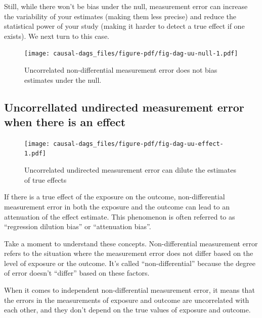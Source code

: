 \documentclass[
  singlecolumn]{report}
\begin{document}
Still, while there won't be bias under the null, measurement error can
increase the variability of your estimates (making them less precise)
and reduce the statistical power of your study (making it harder to
detect a true effect if one exists). We next turn to this case.

\begin{figure}

{\centering \texttt{[image: causal-dags\_files/figure-pdf/fig-dag-uu-null-1.pdf]}

}

\caption{\label{fig-dag-uu-null}Uncorrelated non-differential
measurement error does not bias estimates under the null.}

\end{figure}

\hypertarget{uncorrellated-undirected-measurement-error-when-there-is-an-effect}{%
\subsection{Uncorrellated undirected measurement error when there is an
effect}\label{uncorrellated-undirected-measurement-error-when-there-is-an-effect}}

\begin{figure}

{\centering \texttt{[image: causal-dags\_files/figure-pdf/fig-dag-uu-effect-1.pdf]}

}

\caption{\label{fig-dag-uu-effect}Uncorrelated undirected measurement
error can dilute the estimates of true effects}

\end{figure}

If there is a true effect of the exposure on the outcome,
non-differential measurement error in both the exposure and the outcome
can lead to an attenuation of the effect estimate. This phenomenon is
often referred to as ``regression dilution bias'' or ``attenuation
bias''.

Take a moment to understand these concepts. Non-differential measurement
error refers to the situation where the measurement error does not
differ based on the level of exposure or the outcome. It's called
``non-differential'' because the degree of error doesn't ``differ''
based on these factors.

When it comes to independent non-differential measurement error, it
means that the errors in the measurements of exposure and outcome are
uncorrelated with each other, and they don't depend on the true values
of exposure and outcome.
\end{document}

